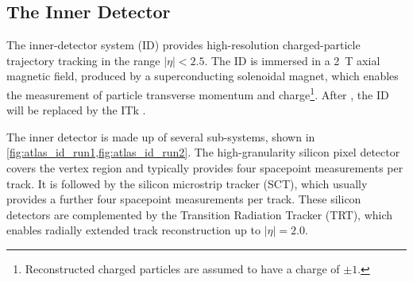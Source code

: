 \subsection{The Inner Detector}\label{sec:atlas_id}

The inner-detector system (ID) provides high-resolution charged-particle trajectory tracking in the range $|\eta| < 2.5$.
The ID is immersed in a \SI{2}{\tesla} axial magnetic field, produced by a superconducting solenoidal magnet, which enables the measurement of particle transverse momentum and charge\footnote{Reconstructed charged particles are assumed to have a charge of $\pm 1$.}.
After \runthree, the ID will be replaced by the ITk \cite{CERN-LHCC-2017-021}.

The inner detector is made up of several sub-systems, shown in \cref{fig:atlas_id_run1,fig:atlas_id_run2}.
The high-granularity silicon pixel detector covers the vertex region and typically provides four spacepoint measurements per track.
It is followed by the silicon microstrip tracker (SCT), which usually provides a further four spacepoint measurements per track.
These silicon detectors are complemented by the Transition Radiation Tracker (TRT),
which enables radially extended track reconstruction up to \(|\eta| = 2.0\). 


